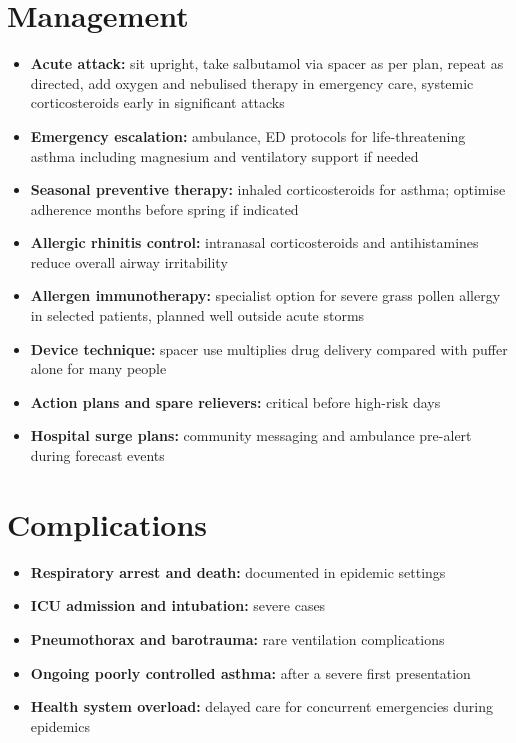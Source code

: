 \section*{Management}
\begin{itemize}
    \item \textbf{Acute attack:} sit upright, take salbutamol via spacer as per plan, repeat as directed, add oxygen and nebulised therapy in emergency care, systemic corticosteroids early in significant attacks
    \item \textbf{Emergency escalation:} ambulance, ED protocols for life-threatening asthma including magnesium and ventilatory support if needed
    \item \textbf{Seasonal preventive therapy:} inhaled corticosteroids for asthma; optimise adherence months before spring if indicated
    \item \textbf{Allergic rhinitis control:} intranasal corticosteroids and antihistamines reduce overall airway irritability
    \item \textbf{Allergen immunotherapy:} specialist option for severe grass pollen allergy in selected patients, planned well outside acute storms
    \item \textbf{Device technique:} spacer use multiplies drug delivery compared with puffer alone for many people
    \item \textbf{Action plans and spare relievers:} critical before high-risk days
    \item \textbf{Hospital surge plans:} community messaging and ambulance pre-alert during forecast events
\end{itemize}

\section*{Complications}
\begin{itemize}
    \item \textbf{Respiratory arrest and death:} documented in epidemic settings
    \item \textbf{ICU admission and intubation:} severe cases
    \item \textbf{Pneumothorax and barotrauma:} rare ventilation complications
    \item \textbf{Ongoing poorly controlled asthma:} after a severe first presentation
    \item \textbf{Health system overload:} delayed care for concurrent emergencies during epidemics
\end{itemize}

